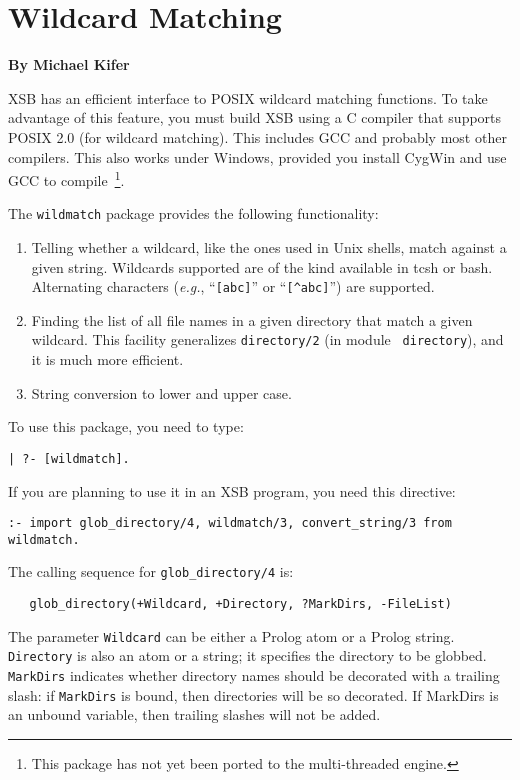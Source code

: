 \chapter{Wildcard Matching}
\label{chap-wildcard}

\begin{center}
{\Large {\bf By Michael Kifer}}
\end{center}

XSB has an efficient interface to POSIX 
wildcard matching functions.  To take advantage of this feature, you
must build XSB using a C compiler that supports
POSIX 2.0 (for wildcard
matching).  This includes GCC and
probably most other compilers. This also works under Windows,
provided you install CygWin and use GCC to
compile~\footnote{This package has not yet been ported to the
  multi-threaded engine.}.


The \texttt{wildmatch}  package provides the following functionality: 
\begin{enumerate}
\item Telling whether a wildcard, like the ones used in Unix shells, match
  against a given string. Wildcards supported are of the kind available in
  tcsh or bash. Alternating characters ({\it e.g.}, ``\verb|[abc]|'' or
  ``\verb|[^abc]|'') are supported.
\item Finding the list of all file names in a given directory that match a
  given wildcard. This facility generalizes {\tt directory/2} (in module {\tt
    directory}), and it is much more efficient.
\item String conversion to lower and upper case.
\end{enumerate}

To use this package, you need to type:
\begin{verbatim}
| ?- [wildmatch].  
\end{verbatim}
If you are planning to use it in an XSB program, you need
this directive:
\begin{verbatim}
:- import glob_directory/4, wildmatch/3, convert_string/3 from wildmatch.
\end{verbatim}

The calling sequence for \verb|glob_directory/4| is:
\begin{verbatim}
   glob_directory(+Wildcard, +Directory, ?MarkDirs, -FileList)  
\end{verbatim}
The parameter {\tt Wildcard} can be either a Prolog atom or a Prolog
string. {\tt Directory} is also an atom or a string; it specifies the
directory to be globbed. {\tt MarkDirs} indicates whether directory names
should be decorated with a trailing slash: if {\tt MarkDirs} is bound, then
directories will be so decorated. If MarkDirs is an unbound variable, then
trailing slashes will not be added.

